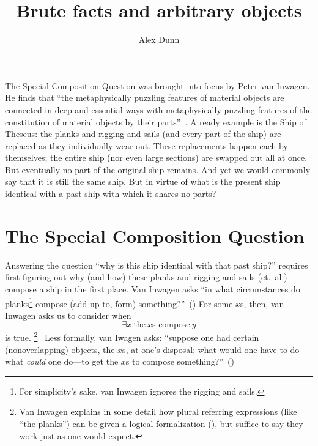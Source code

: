 \documentclass[11pt]{article}
\title{Brute facts and arbitrary objects}
\author{Alex Dunn}
\begin{document}
\ifstandalone
\maketitle
\begin{spacing}{1.5}
\fi



The Special Composition Question was brought into focus by Peter van Inwagen. He finds that ``the metaphysically puzzling features of material objects are connected in deep and essential ways with metaphysically puzzling features of the constitution of material objects by their parts''~\citep[18]{inwagen1995}. A ready example is the Ship of Theseus: the planks and rigging and sails (and every part of the ship) are replaced as they individually wear out. These replacements happen each by themselves; the entire ship (nor even large sections) are swapped out all at once. But eventually no part of the original ship remains. And yet we would commonly say that it is still the same ship. But in virtue of what is the present ship identical with a past ship with which it shares no parts?

\section{The Special Composition Question}
Answering the question ``why is this ship identical with that past ship?'' requires first figuring out why (and how) these planks and rigging and sails (et.\ al.) compose a ship in the first place. Van Inwagen asks ``in what circumstances do planks\footnote{For simplicity's sake, van Inwagen ignores the rigging and sails.} compose (add up to, form) something?''~(\citeyear[21]{inwagen1995}) For some $x$s, then, van Inwagen asks us to consider when
\begin{equation}
\exists x\ \text{the}\ x\text{s compose}\ y
\end{equation}
is true.%
\footnote{Van Inwagen explains in some detail how plural referring expressions (like ``the planks'') can be given a logical formalization (\citeyear[23--28]{inwagen1995}), but suffice to say they work just as one would expect.}%
%
\ Less formally, van Iwagen asks: ``suppose one had certain (nonoverlapping) objects, the $x$s, at one's disposal; what would one have to do---what {\em could} one do---to get the $x$s to compose something?''~(\citeyear[31]{inwagen1995})


\end{spacing}
\end{document}
